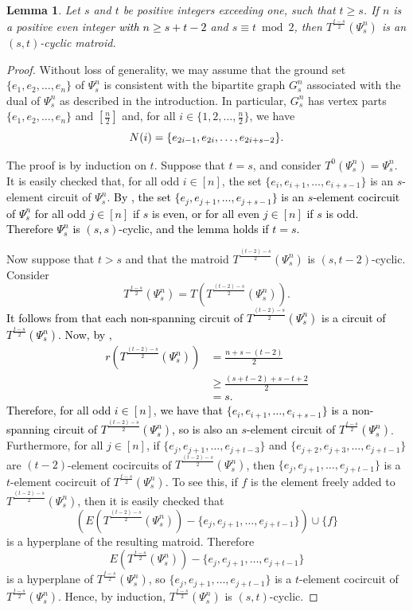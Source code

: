 \documentclass[11pt]{amsart}
\newtheorem{lemma}[theorem]{Lemma}
\newcommand{\blue}{\textcolor{black}}
\newcommand{\bloo}{\textcolor{black}}
\begin{document}
\begin{lemma}
Let $s$ and $t$ be positive integers exceeding one, such that $t \ge s$. If $n$ is a positive even integer \blue{with $n \geq s+t-2$} and $s\equiv t\bmod{2}$, then $T^{\frac{t-s}{2}}(\Psi^n_s)$ is an $(s, t)$-cyclic matroid.
\label{truncation2}
\end{lemma}

\begin{proof}
Without loss of generality, we may assume that the ground set $\{e_1, e_2, \ldots, e_n\}$ of $\Psi^n_s$ is consistent with the bipartite graph $G^n_s$ associated with the dual of $\Psi^n_s$ as described in the introduction. In particular, $G^n_s$ has vertex parts $\{e_1, e_2, \ldots, e_n\}$ and $[\frac{n}{2}]$ and, for all $i\in \{1, 2, \ldots, \frac{n}{2}\}$, we have
$$\bloo{N(i)}=\{e_{2i-1}, e_{2i}, \ldots, e_{2i+s-2}\}.$$

The proof is by induction on $t$. Suppose that $t=s$, and consider $\left.T^0(\Psi^n_s)=\Psi^n_s\right.$. It is easily checked that, for all odd $i\in [n]$, the set $\{e_i, e_{i+1}, \ldots, e_{i+s-1}\}$ is an $s$-element circuit of $\Psi^n_s$. \bloo{By , the set $\{e_j,e_{j+1},\ldots,e_{j+s-1}\}$ is an $s$-element cocircuit of $\Psi^n_s$ for all odd $j \in [n]$ if $s$ is even, or for all even $j \in [n]$ if $s$ is odd. Therefore $\Psi^n_s$ is $(s,s)$-cyclic, and the lemma holds if $t = s$.}

Now suppose that $t > s$ and that the matroid $T^{\frac{(t-2)-s}{2}}(\Psi^n_s)$ is $(s, t-2)$-cyclic. Consider
$$T^{\frac{t-s}{2}}(\Psi^n_s)=T\left(T^{\frac{(t-2)-s}{2}}(\Psi^n_s)\right).$$
\blue{It follows from  that each non-spanning circuit of $T^{\frac{(t-2)-s}{2}}(\Psi^n_s)$ is a circuit of $T^{\frac{t-s}{2}}(\Psi^n_s)$. Now, by ,
\begin{align*}
r\left(T^{\frac{(t-2)-s}{2}}(\Psi^n_s)\right) & = {\textstyle \frac{n+s-(t-2)}{2}} \\
& \ge {\textstyle \frac{(s+t-2)+s-t+2}{2}} \\
& = s.
\end{align*}
Therefore, for all odd \bloo{$i\in[n]$}, we have that $\{e_i, e_{i+1}, \ldots, e_{i+s-1}\}$ is a non-spanning circuit of $T^{\frac{(t-2)-s}{2}}(\Psi^n_s)$, so is also an $s$-element circuit of $T^{\frac{t-s}{2}}(\Psi^n_s)$}. Furthermore, for all $j\in [n]$, if $\{e_j, e_{j+1}, \ldots, e_{j+t-3}\}$ and $\{e_{j+2}, e_{j+3}, \ldots, e_{j+t-1}\}$ are $(t-2)$-element cocircuits of $T^{\frac{(t-2)-s}{2}}(\Psi^n_s)$, then $\{e_j, e_{j+1}, \ldots, e_{j+t-1}\}$ is a $t$-element cocircuit of $T^{\frac{t-s}{2}}(\Psi^n_s)$. To see this, if $f$ is the element freely added to $T^{\frac{(t-2)-s}{2}}(\Psi^n_s)$, then it is easily checked that
$$\left(E\left(T^{\frac{(t-2)-s}{2}}(\Psi^n_s)\right)-\{e_j, e_{j+1}, \ldots, e_{j+t-1}\}\right)\cup \{f\}$$
is a hyperplane of the resulting matroid. Therefore
$$E\left(T^{\frac{t-s}{2}}(\Psi^n_s)\right)-\{e_j, e_{j+1}, \ldots, e_{j+t-1}\}$$
is a hyperplane of $T^{\frac{t-s}{2}}(\Psi^n_s)$, so $\{e_j, e_{j+1}, \ldots, e_{j+t-1}\}$ is a $t$-element cocircuit of $T^{\frac{t-s}{2}}(\Psi^n_s)$. Hence, by induction, $T^{\frac{t-s}{2}}(\Psi^n_s)$ is $(s, t)$-cyclic.
\end{proof}
\end{document}
